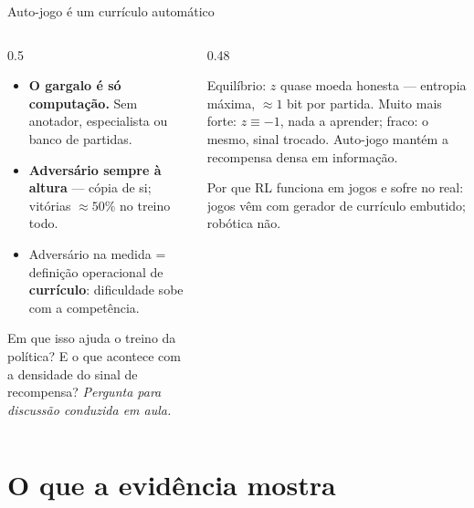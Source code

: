 \documentclass[aspectratio=169, 10pt]{beamer}
\newcommand{\paradiscussao}{\smallskip
  {\footnotesize\color{rlCinza}\itshape Pergunta para discussão conduzida em aula.}}
\begin{document}
\begin{frame}{Auto-jogo é um currículo automático}
  \footnotesize
  \begin{columns}[T]
    \begin{column}{0.5\textwidth}
      \begin{itemize}\setlength{\itemsep}{0.4em}
        \item \textbf{O gargalo é só computação.} Sem anotador, especialista ou banco de partidas.
        \item \textbf{Adversário sempre à altura} — cópia de si; vitórias $\approx 50\%$ no treino todo.
        \item Adversário na medida = definição operacional de \textbf{currículo}: dificuldade sobe com a competência.
      \end{itemize}
      \medskip
      \begin{quizbox}{}
        Em que isso ajuda o treino da política? E o que acontece com a densidade
        do sinal de recompensa?
        \paradiscussao
      \end{quizbox}
    \end{column}
    \begin{column}{0.48\textwidth}
      \pause
      \begin{respbox}
        Equilíbrio: $z$ quase moeda honesta — entropia máxima, $\approx 1$ bit por partida. Muito mais forte: $z \equiv -1$, nada a aprender; fraco: o mesmo, sinal trocado. Auto-jogo mantém a recompensa \alert{densa em informação}.
      \end{respbox}
      \begin{ideiabox}
        Por que RL funciona em jogos e sofre no real: jogos vêm com gerador de currículo embutido; robótica não.
      \end{ideiabox}
    \end{column}
  \end{columns}
\end{frame}

\section{O que a evidência mostra}
\end{document}
